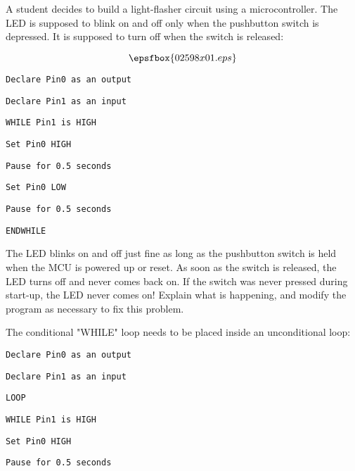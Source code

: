 

A student decides to build a light-flasher circuit using a microcontroller.  The LED is supposed to blink on and off only when the pushbutton switch is depressed.  It is supposed to turn off when the switch is released:

$$\epsfbox{02598x01.eps}$$

\noindent
{}

{\tt Declare Pin0 as an output}

{\tt Declare Pin1 as an input}

{\tt WHILE Pin1 is HIGH}

\hskip 10pt {\tt Set Pin0 HIGH}

\hskip 10pt {\tt Pause for 0.5 seconds}

\hskip 10pt {\tt Set Pin0 LOW}

\hskip 10pt {\tt Pause for 0.5 seconds}

{\tt ENDWHILE}

\vskip 10pt

The LED blinks on and off just fine as long as the pushbutton switch is held when the MCU is powered up or reset.  As soon as the switch is released, the LED turns off and never comes back on.  If the switch was never pressed during start-up, the LED never comes on!  Explain what is happening, and modify the program as necessary to fix this problem.







The conditional "WHILE" loop needs to be placed inside an unconditional loop:

\vskip 10pt

\noindent
{}

{\tt Declare Pin0 as an output}

{\tt Declare Pin1 as an input}

{\tt LOOP}

\hskip 10pt {\tt WHILE Pin1 is HIGH}

\hskip 20pt {\tt Set Pin0 HIGH}

\hskip 20pt {\tt Pause for 0.5 seconds}

